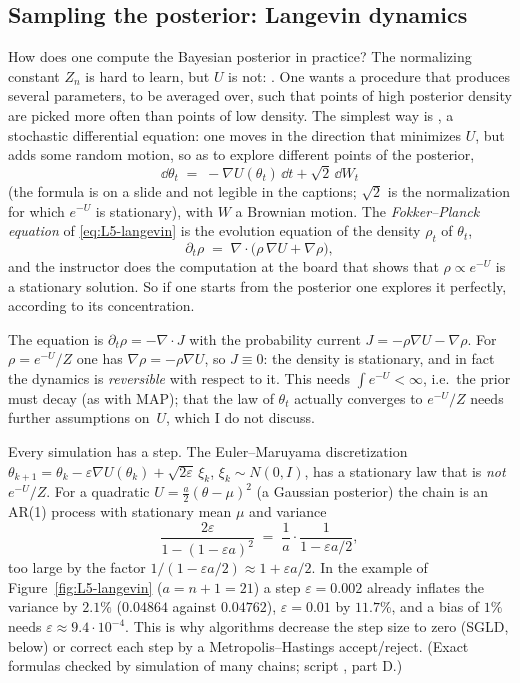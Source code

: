 \subsection{Sampling the posterior: Langevin dynamics}\label{sec:L5-langevin}
How does one compute the Bayesian posterior in practice? The normalizing constant $Z_n$ is hard to learn, but $U$ is not: . One wants a procedure that produces several parameters, to be averaged over, such that points of high posterior density are picked more often than points of low density. The simplest way is , a stochastic differential equation: one moves in the direction that minimizes $U$, but adds some random motion, so as to explore different points of the posterior,
\begin{equation}\label{eq:L5-langevin}
  \dd\theta_t\;=\;-\nabla U(\theta_t)\,\dd t+\sqrt2\,\dd W_t
\end{equation}
(the formula is on a slide and not legible in the captions; $\sqrt2$ is the normalization for which $e^{-U}$ is stationary), with $W$ a Brownian motion. The \emph{Fokker--Planck equation} of \eqref{eq:L5-langevin} is the evolution equation of the density $\rho_t$ of $\theta_t$,
\[
  \partial_t\rho\;=\;\nabla\!\cdot\!\big(\rho\,\nabla U+\nabla\rho\big),
\]
and the instructor does the computation at the board that shows that $\rho\propto e^{-U}$ is a stationary solution. So if one starts from the posterior one explores it perfectly, according to its concentration.

\begin{beyond}
The equation is $\partial_t\rho=-\nabla\!\cdot J$ with the probability current $J=-\rho\nabla U-\nabla\rho$. For $\rho=e^{-U}/Z$ one has $\nabla\rho=-\rho\nabla U$, so $J\equiv0$: the density is stationary, and in fact the dynamics is \emph{reversible} with respect to it. This needs $\int e^{-U}<\infty$, i.e.\ the prior must decay (as with MAP); that the law of $\theta_t$ actually converges to $e^{-U}/Z$ needs further assumptions on~$U$, which I do not discuss.

Every simulation has a step. The Euler--Maruyama discretization $\theta_{k+1}=\theta_k-\varepsilon\nabla U(\theta_k)+\sqrt{2\varepsilon}\,\xi_k$, $\xi_k\sim N(0,I)$, has a stationary law that is \emph{not} $e^{-U}/Z$. For a quadratic $U=\frac a2(\theta-\mu)^2$ (a Gaussian posterior) the chain is an AR(1) process with stationary mean $\mu$ and variance
\[
  \frac{2\varepsilon}{1-(1-\varepsilon a)^2}\;=\;\frac1a\cdot\frac1{1-\varepsilon a/2},
\]
too large by the factor $1/(1-\varepsilon a/2)\approx1+\varepsilon a/2$. In the example of Figure~\ref{fig:L5-langevin} ($a=n+1=21$) a step $\varepsilon=0.002$ already inflates the variance by $2.1\%$ ($0.04864$ against $0.04762$), $\varepsilon=0.01$ by $11.7\%$, and a bias of $1\%$ needs $\varepsilon\approx9.4\cdot10^{-4}$. This is why algorithms decrease the step size to zero (SGLD, below) or correct each step by a Metropolis--Hastings accept/reject. (Exact formulas checked by simulation of many chains; script , part D.)
\end{beyond}

